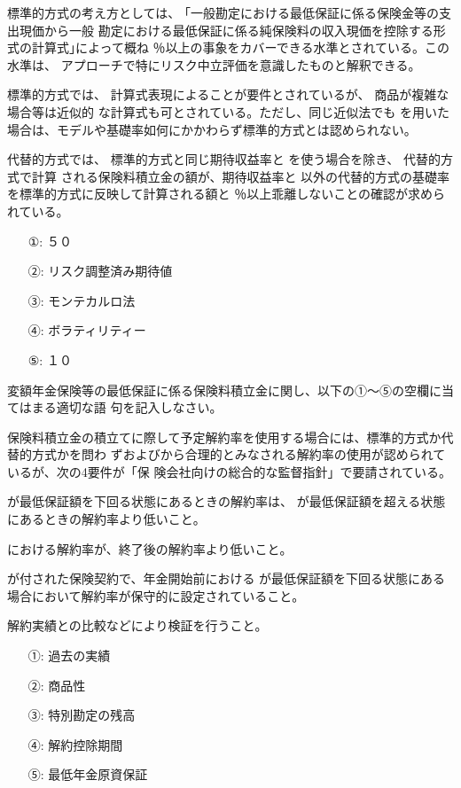 \documentclass[report,gutter=10mm,fore-edge=10mm,uplatex,dvipdfmx]{jlreq}
\begin{document}
標準的方式の考え方としては、 ｢一般勘定における最低保証に係る保険金等の支出現価から一般
勘定における最低保証に係る純保険料の収入現価を控除する形式の計算式｣によって概ね
％以上の事象をカバーできる水準とされている。この水準は、
アプローチで特にリスク中立評価を意識したものと解釈できる。

標準的方式では、 計算式表現によることが要件とされているが、 商品が複雑な場合等は近似的
な計算式も可とされている。ただし、同じ近似法でも
を用いた場合は、モデルや基礎率如何にかかわらず標準的方式とは認められない。

代替的方式では、 標準的方式と同じ期待収益率と
を使う場合を除き、 代替的方式で計算
される保険料積立金の額が、期待収益率と
以外の代替的方式の基礎率を標準的方式に反映して計算される額と
％以上乖離しないことの確認が求められている。
\answer{}
\begin{itemize}
 \item[①: ]  ５０
 \item[②: ]  リスク調整済み期待値
 \item[③: ]  モンテカルロ法
 \item[④: ]  ボラティリティー
 \item[⑤: ]  １０
\end{itemize}

変額年金保険等の最低保証に係る保険料積立金に関し、以下の①～⑤の空欄に当てはまる適切な語
句を記入しなさい。

保険料積立金の積立てに際して予定解約率を使用する場合には、標準的方式か代替的方式かを問わ
ずおよびから合理的とみなされる解約率の使用が認められているが、次の4要件が「保
険会社向けの総合的な監督指針」で要請されている。

が最低保証額を下回る状態にあるときの解約率は、
が最低保証額を超える状態にあるときの解約率より低いこと。

における解約率が、終了後の解約率より低いこと。

が付された保険契約で、年金開始前における
が最低保証額を下回る状態にある場合において解約率が保守的に設定されていること。

解約実績との比較などにより検証を行うこと。

\answer{}
\begin{itemize}
\item[①: ] 過去の実績
\item[②: ] 商品性
\item[③: ] 特別勘定の残高
\item[④: ] 解約控除期間
\item[⑤: ] 最低年金原資保証
\end{itemize}
\end{document}

